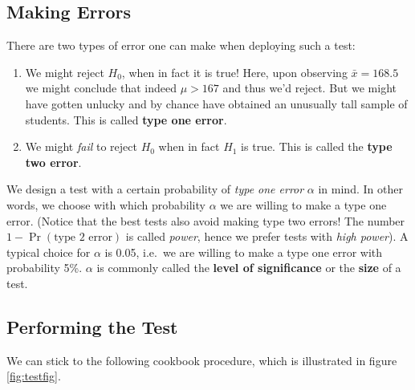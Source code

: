 \documentclass[]{book}
\providecommand{\tightlist}{%
  \setlength{\itemsep}{0pt}\setlength{\parskip}{0pt}}
\begin{document}
\hypertarget{making-errors}{%
\subsection{Making Errors}\label{making-errors}}

There are two types of error one can make when deploying such a test:

\begin{enumerate}
\def\labelenumi{\arabic{enumi}.}
\tightlist
\item
  We might reject \(H_0\), when in fact it is true! Here, upon observing \(\bar{x} = 168.5\) we might conclude that indeed \(\mu > 167\) and thus we'd reject. But we might have gotten unlucky and by chance have obtained an unusually tall sample of students. This is called \textbf{type one error}.
\item
  We might \emph{fail} to reject \(H_0\) when in fact \(H_1\) is true. This is called the \textbf{type two error}.
\end{enumerate}

We design a test with a certain probability of \emph{type one error} \(\alpha\) in mind. In other words, we choose with which probability \(\alpha\) we are willing to make a type one error. (Notice that the best tests also avoid making type two errors! The number \(1-\Pr(\text{type 2 error})\) is called \emph{power}, hence we prefer tests with \emph{high power}). A typical choice for \(\alpha\) is 0.05, i.e.~we are willing to make a type one error with probability 5\%. \(\alpha\) is commonly called the \textbf{level of significance} or the \textbf{size} of a test.

\hypertarget{performing-the-test}{%
\subsection{Performing the Test}\label{performing-the-test}}

We can stick to the following cookbook procedure, which is illustrated in figure \ref{fig:testfig}.
\end{document}
